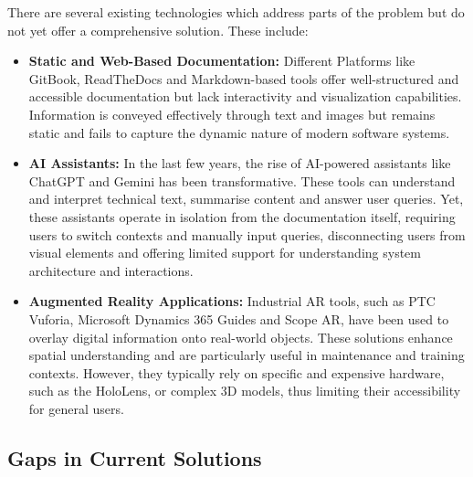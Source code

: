 \documentclass[10pt]{article}
\begin{document}
    There are several existing technologies which address parts of the problem but do not yet offer a comprehensive solution. These include:
        \begin{itemize}
            \item \textbf{Static and Web-Based Documentation:}
                Different Platforms like GitBook, ReadTheDocs and Markdown-based tools offer well-structured and accessible documentation but lack interactivity and visualization capabilities. Information is conveyed effectively through text and images
                but remains static and fails to capture the dynamic nature of modern software systems.
            \item \textbf{AI Assistants:}
                In the last few years, the rise of AI-powered assistants like ChatGPT and Gemini has been transformative. These tools can understand and interpret technical text, summarise content and answer user queries. Yet, these
                assistants operate in isolation from the documentation itself, requiring users to switch contexts and manually input queries, disconnecting users from visual elements and offering limited support for understanding
                system architecture and interactions.
            \item \textbf{Augmented Reality Applications:}
                Industrial AR tools, such as PTC Vuforia, Microsoft Dynamics 365 Guides and Scope AR, have been used to overlay digital information onto real-world objects. These solutions enhance spatial understanding and are particularly useful in maintenance
                and training contexts. However, they typically rely on specific and expensive hardware, such as the HoloLens, or complex 3D models, thus limiting their accessibility for general users.
        \end{itemize}

    \subsection{Gaps in Current Solutions}
\end{document}
